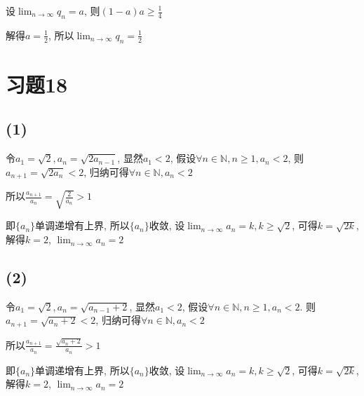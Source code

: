 \documentclass[a4paper,11pt]{article}
\newcommand{\Limit}{\displaystyle \lim_{n \rightarrow \infty}}
\begin{document}
设$\Limit q_n = a$, 则$(1-a)a \ge \frac{1}{4}$

解得$a=\frac{1}{2}$, 所以$\Limit q_n = \frac{1}{2}$
\section*{习题18}
\subsection*{(1)}
令$a_1 = \sqrt{2}, a_n=\sqrt{2a_{n-1}}$, 显然$a_1 < 2$, 假设$\forall n \in \mathbb{N}, n \ge 1, a_n < 2$, 则$a_{n+1} = \sqrt{2a_n} < 2$, 归纳可得$\forall n \in \mathbb{N}, a_n < 2$

所以$\frac{a_{n+1}}{a_n} = \sqrt{\frac{2}{a_n}} > 1$

即$\{a_n\}$单调递增有上界, 所以$\{a_n\}$收敛, 设$\Limit a_n = k, k \ge \sqrt{2}$, 可得$k = \sqrt{2k}$, 解得$k = 2$, $\Limit a_n = 2$
\subsection*{(2)}
令$a_1 = \sqrt{2}, a_n=\sqrt{a_{n-1}+2}$, 显然$a_1 < 2$, 假设$\forall n \in \mathbb{N}, n \ge 1, a_n < 2$. 则$a_{n+1} = \sqrt{a_n + 2} < 2$, 归纳可得$\forall n \in \mathbb{N}, a_n < 2$

所以$\frac{a_{n+1}}{a_n} = \frac{\sqrt{a_n+2}}{a_n} > 1$

即$\{a_n\}$单调递增有上界, 所以$\{a_n\}$收敛, 设$\Limit a_n = k, k \ge \sqrt{2}$, 可得$k = \sqrt{2k}$, 解得$k = 2$, $\Limit a_n = 2$
\end{document}
